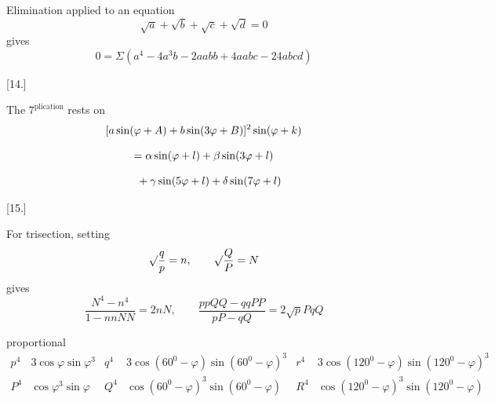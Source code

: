 
Elimination applied to an equation
\[
\surd a+\surd b+\surd c+\surd d=0
\]
gives
\[
0=\Sigma(a^4-4a^3b-2aabb+4aabc-24abcd)
\]


\par\medskip{}\centerline{[14.]}\nobreak\smallskip
The $7^{\mathrm{plication}}$ rests on
\[
\begin{gathered}
\relax[a\sin(\varphi+A)+b\sin(3\varphi+B)]^2\sin(\varphi+k)\\[8pt]
=\alpha\sin(\varphi+l)
 +\beta\sin(3\varphi+l)
 \\[8pt]\quad{}+\gamma\sin(5\varphi+l)+\delta\sin(7\varphi+l)
\end{gathered}
\]


\par\medskip{}\centerline{[15.]}\nobreak\smallskip
For trisection, setting
\[
\surd\frac{q}{p}=n,\qquad \surd\frac{Q}{P}=N
\]
gives
\[
\frac{N^{4}
 -n^{4}}{1-nnNN}
 =2nN,\qquad
\frac{ppQQ-qqPP}{pP-qQ}=2\surd pPqQ
\]

proportional
\begingroup\small\setlength{\arraycolsep}{1.5pt}\[
\begin{array}{c|l||c|l||c|l}
p^4&3\cos\varphi\sin\varphi^3
&q^4&3\cos(60^0-\varphi)\sin(60^0-\varphi)^3
&r^4&3\cos(120^0-\varphi)\sin(120^0-\varphi)^3\\[8pt]
P^4&\cos\varphi^3\sin\varphi
&Q^4&\cos(60^0-\varphi)^3\sin(60^0-\varphi)
&R^4&\cos(120^0-\varphi)^3\sin(120^0-\varphi)
\end{array}
\]\endgroup

\clearpage
\endgroup
